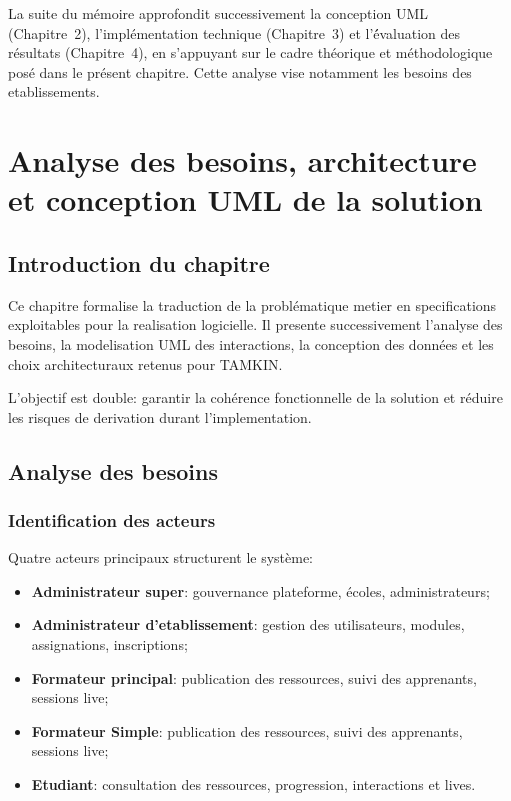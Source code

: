 \documentclass[12pt,a4paper,oneside]{report}
\begin{document}
La suite du m\'emoire approfondit successivement la conception UML (Chapitre~2), l'impl\'ementation technique (Chapitre~3) et l'\'évaluation des r\'esultats (Chapitre~4), en s'appuyant sur le cadre th\'eorique et m\'ethodologique pos\'e dans le pr\'esent chapitre. Cette analyse vise notamment les besoins des etablissements.


\chapter{Analyse des besoins, architecture et conception UML de la solution}

\section{Introduction du chapitre}

Ce chapitre formalise la traduction de la problématique metier en specifications exploitables pour la realisation logicielle. Il presente successivement l'analyse des besoins, la modelisation UML des interactions, la conception des données et les choix architecturaux retenus pour TAMKIN.

L'objectif est double: garantir la cohérence fonctionnelle de la solution et réduire les risques de derivation durant l'implementation.

\section{Analyse des besoins}

\subsection{Identification des acteurs}

Quatre acteurs principaux structurent le système:
\begin{itemize}
  \item \textbf{Administrateur super}: gouvernance plateforme, écoles, administrateurs;
  \item \textbf{Administrateur d'etablissement}: gestion des utilisateurs, modules, assignations, inscriptions;
  \item \textbf{Formateur principal}: publication des ressources, suivi des apprenants, sessions live;
  \item \textbf{Formateur Simple}: publication des ressources, suivi des apprenants, sessions live;
  \item \textbf{Etudiant}: consultation des ressources, progression, interactions et lives.
\end{itemize}
\end{document}
